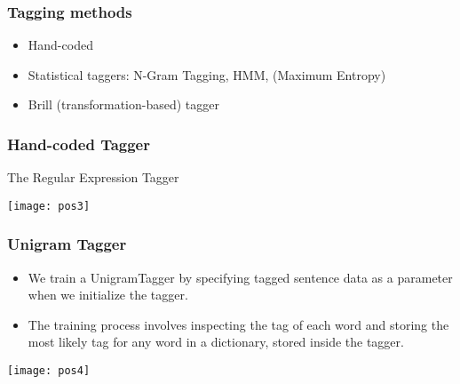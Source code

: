 \begin{frame}[fragile]\frametitle{Tagging methods}
  \begin{itemize}
  \item Hand-coded
  \item Statistical taggers: N-Gram Tagging, HMM, (Maximum Entropy)
  \item Brill (transformation-based) tagger
  \end{itemize}
\end{frame}

\begin{frame}[fragile]\frametitle{Hand-coded Tagger}
The Regular Expression Tagger 

\begin{center}
\texttt{[image: pos3]}
\end{center}
  
\end{frame}

\begin{frame}[fragile]\frametitle{Unigram Tagger}
  \begin{itemize}
  \item We train a UnigramTagger by specifying tagged sentence data as a parameter when we initialize the tagger.
  \item The training process involves inspecting the tag of each word and storing the most likely tag for any word in a dictionary, stored inside the tagger.
  \end{itemize}

\begin{center}
\texttt{[image: pos4]}
\end{center}
  
\end{frame}


